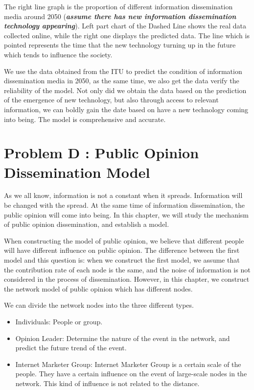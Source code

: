 \documentclass[a4paper,11pt]{article}
\begin{document}
\par The right line graph is the proportion of different information dissemination media around 2050 (\textbf{\emph{assume there has new information dissemination technology appearing}}). Left part chart of the Dashed Line shows the real data collected online, while the right one displays the predicted data. The line which is pointed represents the time that the new technology turning up in the future which tends to influence the society.

\par We use the data obtained from the ITU to predict the condition of information dissemination media in 2050, as the same time, we also get the data verify the reliability of the model. Not only did we obtain the data based on the prediction of the emergence of new technology, but also through access to relevant information, we can boldly gain the date based on have a new technology coming into being. The model is comprehensive and accurate.









\section{Problem D : Public Opinion Dissemination Model}
\par As we all know, information is not a constant when it spreads. Information will be changed with the spread. At the same time of information dissemination, the public opinion will come into being. In this chapter, we will study the mechanism of public opinion dissemination, and establish a model.
\par When constructing the model of public opinion, we believe that different people will have different influence on public opinion. The difference between the first model and this question is: when we construct the first model, we assume that the contribution rate of each node is the same, and the noise of information is not considered in the process of dissemination. However, in this chapter, we construct the network model of public opinion which has different nodes.
\par We can divide the network nodes into the three different types.

\begin{itemize}
\item Individuals: People or group.
\item Opinion Leader: Determine the nature of the event in the network, and predict the future trend of the event.
\item Internet Marketer Group: Internet Marketer Group is a certain scale of the people. They have a certain influence on the event of large-scale nodes in the network. This kind of influence is not related to the distance.
\end{itemize}
\end{document}
